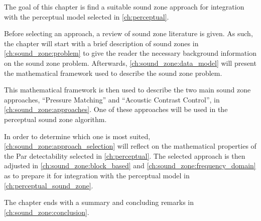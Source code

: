 The goal of this chapter is find a suitable sound zone approach for integration with the perceptual model selected in \autoref{ch:perceptual}.

Before selecting an approach, a review of sound zone literature is given.
As such, the chapter will start with a brief description of sound zones in \autoref{ch:sound_zone:problem} to give the reader 
the necessary background information on the sound zone problem.
Afterwards, \autoref{ch:sound_zone:data_model} will present the mathematical framework  
used to describe the sound zone problem.

This mathematical framework is then used to describe the two main sound zone approaches, ``Pressure Matching'' and ``Acoustic Contrast Control'', 
in \autoref{ch:sound_zone:approaches}.
One of these approaches will be used in the perceptual sound zone algorithm.

In order to determine which one is most suited, \autoref{ch:sound_zone:approach_selection} will reflect on the mathematical properties of the 
Par detectability selected in \autoref{ch:perceptual}.
The selected approach is then adjusted in \autoref{ch:sound_zone:block_based} and \autoref{ch:sound_zone:frequency_domain} as to prepare it for 
integration with the perceptual model in \autoref{ch:perceptual_sound_zone}.

The chapter ends with a summary and concluding remarks in \autoref{ch:sound_zone:conclusion}.
